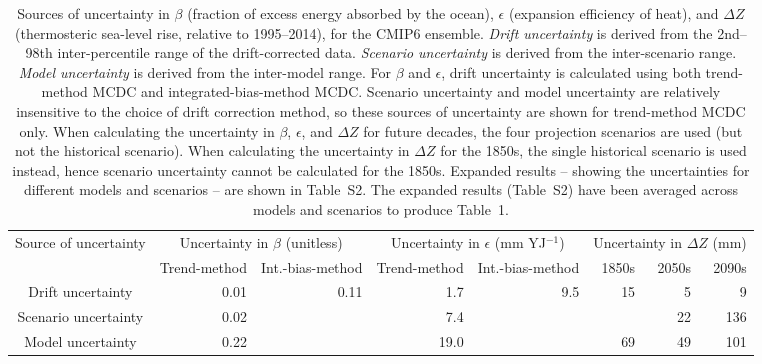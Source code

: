 \begin{table*}[t]
\centering
\caption{Sources of uncertainty in $\beta$ (fraction of excess energy absorbed by the ocean), $\epsilon$ (expansion efficiency of heat), and ${\Delta}Z$ (thermosteric sea-level rise, relative to 1995--2014), for the CMIP6 ensemble. \emph{Drift uncertainty} is derived from the 2nd--98th inter-percentile range of the drift-corrected data. \emph{Scenario uncertainty} is derived from the inter-scenario range. \emph{Model uncertainty} is derived from the inter-model range. For $\beta$ and $\epsilon$, drift uncertainty is calculated using both trend-method MCDC and integrated-bias-method MCDC. Scenario uncertainty and model uncertainty are relatively insensitive to the choice of drift correction method, so these sources of uncertainty are shown for trend-method MCDC only. When calculating the uncertainty in $\beta$, $\epsilon$, and ${\Delta}Z$ for future decades, the four projection scenarios are used (but not the historical scenario). When calculating the uncertainty in ${\Delta}Z$ for the 1850s, the single historical scenario is used instead, hence scenario uncertainty cannot be calculated for the 1850s. Expanded results -- showing the uncertainties for different models and scenarios -- are shown in Table~S2. The expanded results (Table~S2) have been averaged across models and scenarios to produce Table~1.}
\begin{tabular}{c|rr|rr|rrr}
\toprule
Source of uncertainty & \multicolumn{2}{c|}{Uncertainty in $\beta$ (unitless)} & \multicolumn{2}{c|}{Uncertainty in $\epsilon$ (mm YJ$^{-1}$)} & \multicolumn{3}{c}{Uncertainty in ${\Delta}Z$ (mm)} \\
 & Trend-method & Int.-bias-method & Trend-method & Int.-bias-method & 1850s & 2050s & 2090s \\
\midrule
Drift uncertainty & 0.01 & 0.11 & 1.7 & 9.5 & 15 & 5 & 9 \\
Scenario uncertainty & 0.02 &  & 7.4 &  &  & 22 & 136 \\
Model uncertainty & 0.22 &  & 19.0 &  & 69 & 49 & 101 \\
\bottomrule
\end{tabular}
\end{table*}
